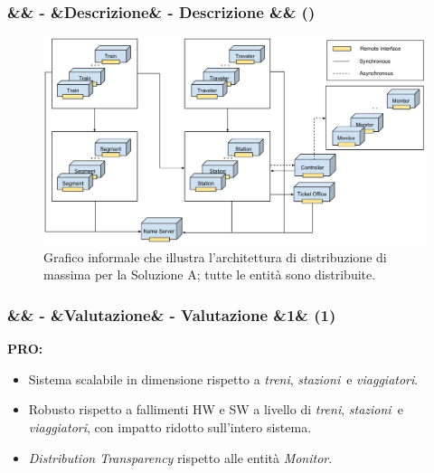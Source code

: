 \documentclass[slidestop,compress,blackandwhite]{beamer}
\newcommand{\ii}[1]{\textit{#1}}
\newcommand{\treno}{\ii{treno}}
\newcommand{\treni}{\ii{treni}}
\newcommand{\viaggiatore}{\ii{viaggiatore}}
\newcommand{\viaggiatori}{\ii{viaggiatori}}
\newcommand{\stazione}{\ii{stazione}}
\newcommand{\stazioni}{\ii{stazioni}}
\newcommand{\biglietteria}{\ii{biglietteria}}
\newcommand{\controller}{\ii{controllo centrale}}
\newcommand{\PRO}{\textbf{PRO:}}
\newcommand{\newtitle}[4]{
	#1 
	\ifx&#2&%
	\else
  		\large- #2
	\fi
	\ifx&#3&%
	\else
  		\normalsize- #3
	\fi
	\ifx&#4&%
	\else
  		\normalsize (#4)
	\fi
}
\newcommand{\newframe}[5]{
	\begin{frame}
		\frametitle{\newtitle{#1}{#2}{#3}{#4}}
		#5
	\end{frame}
}
\begin{document}
	
	\newframe{}{}{Descrizione}{}{
		\begin{figure}
			\includegraphics[scale=0.24,trim=0mm 5mm 0mm 35mm]{imgs/All_distributed.pdf}
			\caption{\scriptsize Grafico informale che illustra l'architettura di distribuzione di massima per la Soluzione A; tutte le entità sono distribuite.}
		\end{figure}
	}
	
			
	
	\newframe{}{}{Valutazione}{1}{
		\PRO
			\vspace{0.5cm}
			\begin{itemize}
				\item Sistema scalabile in dimensione rispetto a \treni, \stazioni~e \viaggiatori.
				\vspace{0.5cm}
				\item Robusto rispetto a fallimenti HW e SW a livello di \treni, \stazioni~e \viaggiatori, con impatto ridotto sull'intero sistema.
				\vspace{0.5cm}
				\item \ii{Distribution Transparency} rispetto alle entità \ii{Monitor}.
			\end{itemize}
		
	}
\end{document}
